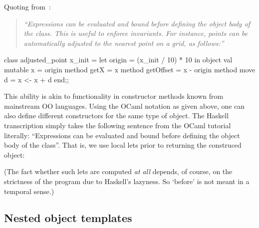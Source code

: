 Quoting from~\cite[\S\,3.1]{OCaml}:

\begin{quote}\itshape
``Expressions can be evaluated and bound before defining the object
body of the class. This is useful to enforce invariants. For instance,
points can be automatically adjusted to the nearest point on a grid,
as follows:''
\end{quote}

\antiskip

\begin{code}
 class adjusted_point x_init =
   let origin = (x_init / 10) * 10 in
   object
     val mutable x    = origin
     method getX      = x
     method getOffset = x - origin
     method move d    = x <- x + d
   end;;
\end{code}

\noindent
This ability is akin to functionality in constructor methods known
from mainstream OO languages. Using the OCaml notation as given above,
one can also define different constructors for the same type of
object. The Haskell transcription simply takes the following sentence
from the OCaml tutorial literally: ``Expressions can be evaluated and
bound before defining the object body of the class''. That is, we use
local lets prior to returning the construced object:

\noindent
(The fact whether such lets are computed \emph{at all} depends, of
course, on the strictness of the program due to Haskell's lazyness. So
`before' is not meant in a temporal sense.)






\subsection{Nested object templates}

